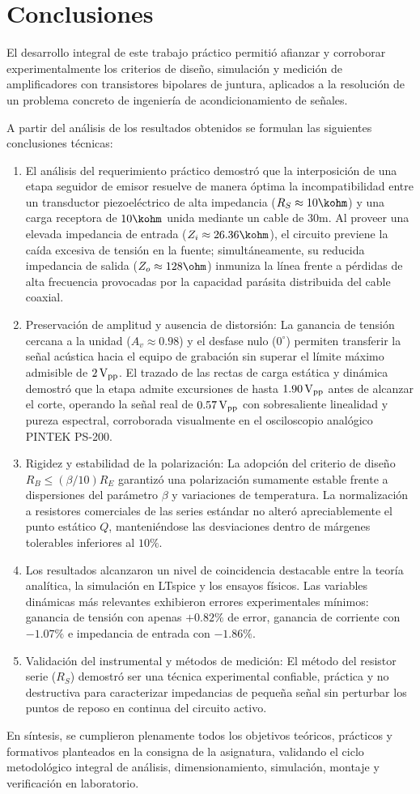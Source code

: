 \chapter{Conclusiones}
\label{chap:conclusiones}

El desarrollo integral de este trabajo práctico permitió afianzar y corroborar experimentalmente los criterios de
diseño, simulación y medición de amplificadores con transistores bipolares de juntura, aplicados a la resolución de un
problema concreto de ingeniería de acondicionamiento de señales.

A partir del análisis de los resultados obtenidos se formulan las siguientes conclusiones técnicas:
\begin{enumerate}
  \item  El análisis del requerimiento práctico demostró
    que la interposición de una etapa seguidor de emisor resuelve de manera óptima la incompatibilidad entre un
    transductor piezoeléctrico de alta impedancia ($R_S \approx 10\kohm$) y una carga receptora de $10\kohm$ unida
    mediante un cable de $30\unit{\meter}$. Al proveer una elevada impedancia de entrada ($Z_i \approx 26.36\kohm$),
    el circuito previene la caída excesiva de tensión en la fuente; simultáneamente, su reducida impedancia de salida
    ($Z_o \approx 128\ohm$) inmuniza la línea frente a pérdidas de alta frecuencia provocadas por la capacidad
    parásita distribuida del cable coaxial.
  \item Preservación de amplitud y ausencia de distorsión: La ganancia de tensión cercana a la unidad ($A_v \approx 0.98$)
    y el desfase nulo ($0^\circ$) permiten transferir la señal acústica hacia el equipo de grabación sin superar el
    límite máximo admisible de $2\,\mathrm{V}_{\mathrm{pp}}$. El trazado de las rectas de carga estática y dinámica demostró que la etapa
    admite excursiones de hasta $1.90\,\mathrm{V}_{\mathrm{pp}}$ antes de alcanzar el corte, operando la señal real de $0.57\,\mathrm{V}_{\mathrm{pp}}$ con
    sobresaliente linealidad y pureza espectral, corroborada visualmente en el osciloscopio analógico PINTEK PS-200.
  \item Rigidez y estabilidad de la polarización: La adopción del criterio de diseño $R_B \le (\beta/10) R_E$
    garantizó una polarización sumamente estable frente a dispersiones del parámetro $\beta$ y variaciones de temperatura.
    La normalización a resistores comerciales de las series estándar no alteró apreciablemente el punto estático $Q$,
    manteniéndose las desviaciones dentro de márgenes tolerables inferiores al $10\%$.
  \item  Los resultados alcanzaron un nivel de coincidencia destacable
    entre la teoría analítica, la simulación en LTspice y los ensayos físicos. Las variables dinámicas más
    relevantes exhibieron errores experimentales mínimos: ganancia de tensión con apenas $+0.82\%$ de error, ganancia
    de corriente con $-1.07\%$ e impedancia de entrada con $-1.86\%$.
  \item Validación del instrumental y métodos de medición: El método del resistor serie ($R_S$) demostró ser una
    técnica experimental confiable, práctica y no destructiva para caracterizar impedancias de pequeña señal sin
    perturbar los puntos de reposo en continua del circuito activo.
\end{enumerate}

En síntesis, se cumplieron plenamente todos los objetivos teóricos, prácticos y formativos planteados en la consigna
de la asignatura, validando el ciclo metodológico integral de análisis, dimensionamiento, simulación, montaje y
verificación en laboratorio.
